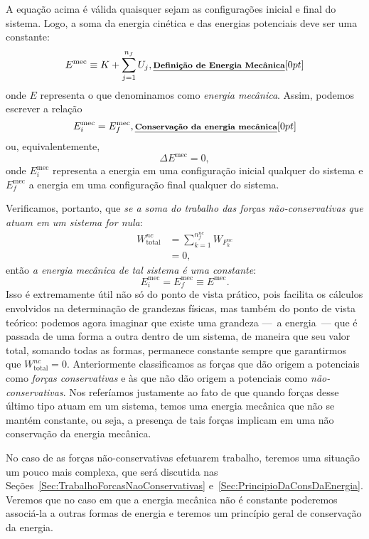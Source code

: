 A equação acima é válida quaisquer sejam as configurações inicial e final do sistema. Logo, a soma da energia cinética e das energias potenciais deve ser uma constante:
\begin{equation}\label{Eq:DefEnergiaMecanicaParticula}
  E^{\text{mec}} \equiv K + \sum_{j = 1}^{n_f} U_j, \relax{\footnotesize\emph{\textbf{Definição de Energia Mecânica}}}[0pt]
\end{equation}
%
onde $E$ representa o que denominamos como \emph{energia mecânica}. Assim, podemos escrever a relação
\begin{equation}
    E_i^{\textrm{mec}} = E_f^{\textrm{mec}}, \relax{\footnotesize\emph{\textbf{Conservação da energia mecânica}}}[0pt]
\end{equation}
%
ou, equivalentemente,
\begin{equation}
    \Delta E^{\textrm{mec}} = 0,
\end{equation}
%
onde $E_i^{\text{mec}}$ representa a energia em uma configuração inicial qualquer do sistema e $E_f^{\text{mec}}$ a energia em uma configuração final qualquer do sistema.

Verificamos, portanto, que \emph{se a soma do trabalho das forças não-conservativas que atuam em um sistema for nula}:
\begin{align}
    W_{\text{total}}^{nc} &= \sum_{k = 1}^{n_f^{nc}} W_{F_k^{nc}} \\
    &= 0,
\end{align}
%
então \emph{a energia mecânica de tal sistema é uma constante}:
\begin{equation}
    E^{\textrm{mec}}_i = E^{\textrm{mec}}_f \equiv E^{\text{mec}}.
\end{equation}
%
Isso é extremamente útil não só do ponto de vista prático, pois facilita os cálculos envolvidos na determinação de grandezas físicas, mas também do ponto de vista teórico: podemos agora imaginar que existe uma grandeza ---~a energia~--- que é passada de uma forma a outra dentro de um sistema, de maneira que seu valor total, somando todas as formas, permanece constante sempre que garantirmos que $W_{\text{total}}^{nc} = 0$. Anteriormente classificamos as forças que dão origem a potenciais como \emph{forças conservativas} e às que não dão origem a potenciais como \emph{não-conservativas}. Nos referíamos justamente ao fato de que quando forças desse último tipo atuam em um sistema, temos uma energia mecânica que não se mantém constante, ou seja, a presença de tais forças implicam em uma não conservação da energia mecânica.

No caso de as forças não-conservativas efetuarem trabalho, teremos uma situação um pouco mais complexa, que será discutida nas Seções~\ref{Sec:TrabalhoForcasNaoConservativas} e~\ref{Sec:PrincipioDaConsDaEnergia}. Veremos que no caso em que a energia mecânica não é constante poderemos associá-la a outras formas de energia e teremos um princípio geral de conservação da energia.

